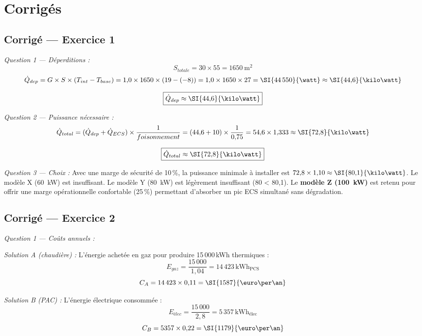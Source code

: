 \newpage
\section*{Corrigés}

\subsection*{Corrigé — Exercice 1}

\textit{Question 1 — Déperditions :}
\[
  S_{totale} = 30 \times 55 = \SI{1650}{\square\metre}
\]
\[
  \dot{Q}_{dep} = G \times S \times (T_{int} - T_{base}) = 1{,}0 \times 1650 \times (19 - (-8)) = 1{,}0 \times 1650 \times 27 = \SI{44\,550}{\watt} \approx \SI{44{,}6}{\kilo\watt}
\]

\[
  \boxed{\dot{Q}_{dep} \approx \SI{44{,}6}{\kilo\watt}}
\]

\textit{Question 2 — Puissance nécessaire :}
\[
  \dot{Q}_{total} = (\dot{Q}_{dep} + \dot{Q}_{ECS}) \times \frac{1}{foisonnement} = (44{,}6 + 10) \times \frac{1}{0{,}75} = 54{,}6 \times 1{,}333 \approx \SI{72{,}8}{\kilo\watt}
\]

\[
  \boxed{\dot{Q}_{total} \approx \SI{72{,}8}{\kilo\watt}}
\]

\textit{Question 3 — Choix :} Avec une marge de sécurité de 10\,\%, la puissance minimale à installer est $72{,}8 \times 1{,}10 \approx \SI{80{,}1}{\kilo\watt}$. Le modèle X (\SI{60}{\kilo\watt}) est insuffisant. Le modèle Y (\SI{80}{\kilo\watt}) est légèrement insuffisant (80 < 80,1). Le \textbf{modèle Z (\SI{100}{\kilo\watt})} est retenu pour offrir une marge opérationnelle confortable (25\,\%) permettant d'absorber un pic ECS simultané sans dégradation.


\subsection*{Corrigé — Exercice 2}

\textit{Question 1 — Coûts annuels :}

\textit{Solution A (chaudière) :} L'énergie achetée en gaz pour produire 15\,000\,kWh thermiques :
\[
  E_{gaz} = \frac{15\,000}{1{,}04} = 14\,423\,\text{kWh}_{\text{PCS}}
\]
\[
  C_A = 14\,423 \times 0{,}11 = \SI{1587}{\euro\per\an}
\]

\textit{Solution B (PAC) :} L'énergie électrique consommée :
\[
  E_{élec} = \frac{15\,000}{2{,}8} = 5\,357\,\text{kWh}_{\text{élec}}
\]
\[
  C_B = 5357 \times 0{,}22 = \SI{1179}{\euro\per\an}
\]

